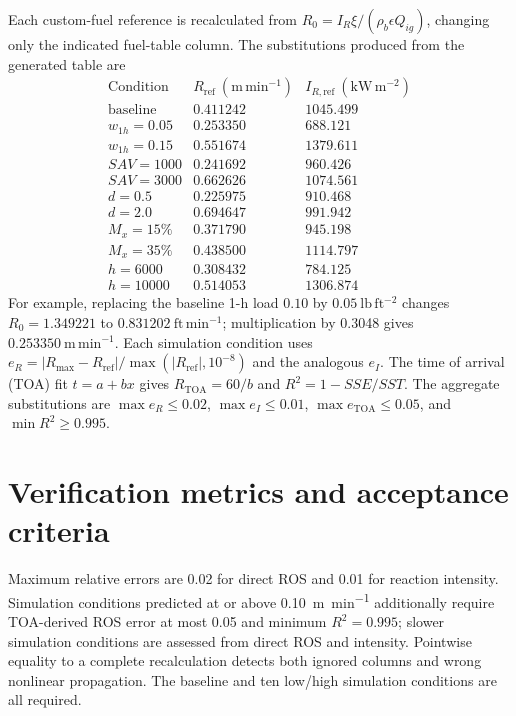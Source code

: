Each custom-fuel reference is recalculated from
\(R_0=I_R\xi/(\rho_b\epsilon Q_{ig})\), changing only the indicated
fuel-table column.  The substitutions produced from the generated table are
\[
\begin{array}{c|rr}
\text{Condition}&R_{\mathrm{ref}}~(\mathrm{m\,min^{-1}})
&I_{R,\mathrm{ref}}~(\mathrm{kW\,m^{-2}})\\\hline
\text{baseline}&0.411242&1045.499\\
w_{1h}=0.05&0.253350&688.121\\
w_{1h}=0.15&0.551674&1379.611\\
SAV=1000&0.241692&960.426\\
SAV=3000&0.662626&1074.561\\
d=0.5&0.225975&910.468\\
d=2.0&0.694647&991.942\\
M_x=15\%&0.371790&945.198\\
M_x=35\%&0.438500&1114.797\\
h=6000&0.308432&784.125\\
h=10000&0.514053&1306.874
\end{array}
\]
For example, replacing the baseline 1-h load \(0.10\) by
\(0.05~\mathrm{lb\,ft^{-2}}\) changes
\(R_0=1.349221\) to \(0.831202~\mathrm{ft\,min^{-1}}\);
multiplication by 0.3048 gives \(0.253350~\mathrm{m\,min^{-1}}\).
Each simulation condition uses
\(e_R=|R_{\max}-R_{\mathrm{ref}}|/
\max(|R_{\mathrm{ref}}|,10^{-8})\) and the analogous \(e_I\).
The time of arrival (TOA) fit \(t=a+bx\) gives \(R_{\mathrm{TOA}}=60/b\) and
\(R^2=1-SSE/SST\).  The aggregate substitutions are
\(\max e_R\leq0.02\), \(\max e_I\leq0.01\),
\(\max e_{\mathrm{TOA}}\leq0.05\), and \(\min R^2\geq0.995\).

\section{Verification metrics and acceptance criteria}
Maximum relative errors are 0.02 for direct ROS and 0.01 for reaction intensity.  Simulation conditions predicted at or above \SI{0.10}{m.min^{-1}} additionally require TOA-derived ROS error at most 0.05 and minimum $R^2=0.995$; slower simulation conditions are assessed from direct ROS and intensity.  Pointwise equality to a complete recalculation detects both ignored columns and wrong nonlinear propagation.  The baseline and ten low/high simulation conditions are all required.

